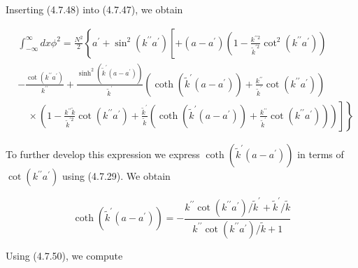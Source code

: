 \documentclass{article}
\begin{document}
Inserting (4.7.48) into (4.7.47), we obtain
 
\begin{align*}
& \int_{-\infty}^{\infty} d x \phi^{2}=\frac{N^{2}}{2}\left\{a^{\prime}+\sin ^{2}\left(k^{\prime \prime} a^{\prime}\right)\left[+\left(a-a^{\prime}\right)\left(1-\frac{k^{\prime \prime 2}}{\tilde{k}^{\prime 2}} \cot ^{2}\left(k^{\prime \prime} a^{\prime}\right)\right)\right.\right.  \tag{4.7.49}\\
& -\frac{\cot \left(k^{\prime \prime} a^{\prime}\right)}{k^{\prime \prime}}+\frac{\sinh ^{2}\left(\tilde{k}^{\prime}\left(a-a^{\prime}\right)\right)}{\tilde{k}^{\prime}}\left(\operatorname{coth}\left(\tilde{k}^{\prime}\left(a-a^{\prime}\right)\right)+\frac{k^{\prime \prime}}{\tilde{k}^{\prime}} \cot \left(k^{\prime \prime} a^{\prime}\right)\right) \\
& \left.\left.\quad \times\left(1-\frac{k^{\prime \prime} \tilde{k}}{\tilde{k}^{\prime 2}} \cot \left(k^{\prime \prime} a^{\prime}\right)+\frac{\tilde{k}^{\prime}}{\tilde{k}}\left(\operatorname{coth}\left(\tilde{k}^{\prime}\left(a-a^{\prime}\right)\right)+\frac{k^{\prime \prime}}{\tilde{k}^{\prime}} \cot \left(k^{\prime \prime} a^{\prime}\right)\right)\right)\right]\right\}
\end{align*}
 

To further develop this expression we express $\operatorname{coth}\left(\tilde{k}^{\prime}\left(a-a^{\prime}\right)\right)$ in terms of $\cot \left(k^{\prime \prime} a^{\prime}\right)$ using (4.7.29). We obtain
 
\begin{equation*}
\operatorname{coth}\left(\tilde{k}^{\prime}\left(a-a^{\prime}\right)\right)=-\frac{k^{\prime \prime} \cot \left(k^{\prime \prime} a^{\prime}\right) / \tilde{k}^{\prime}+\tilde{k}^{\prime} / \tilde{k}}{k^{\prime \prime} \cot \left(k^{\prime \prime} a^{\prime}\right) / \tilde{k}+1} \tag{4.7.50}
\end{equation*}
 

Using (4.7.50), we compute
 
\end{document}
